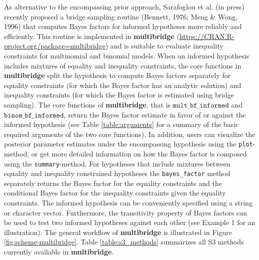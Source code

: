 \documentclass[
  english,
  man,floatsintext]{apa6}
\begin{document}
As alternative to the encompassing prior approach, Sarafoglou et al. (in press) recently proposed a bridge sampling routine (Bennett, 1976; Meng \& Wong, 1996) that computes Bayes factors for informed hypotheses more reliably and efficiently. This routine is implemented in \textbf{multibridge} (\url{https://CRAN.R-project.org/package=multibridge}) and is suitable to evaluate inequality constraints for multinomial and binomial models. When an informed hypothesis includes mixtures of equality and inequality constraints, the core functions in \textbf{multibridge} split the hypothesis to compute Bayes factors separately for equality constraints (for which the Bayes factor has an analytic solution) and inequality constraints (for which the Bayes factor is estimated using bridge sampling). The core functions of \textbf{multibridge}, that is \(\texttt{mult\_bf\_informed}\) and \(\texttt{binom\_bf\_informed}\), return the Bayes factor estimate in favor of or against the informed hypothesis (see Table \ref{table:arguments} for a summary of the basic required arguments of the two core functions). In addition, users can visualize the posterior parameter estimates under the encompassing hypothesis using the \texttt{plot}-method, or get more detailed information on how the Bayes factor is composed using the \texttt{summary}-method. For hypotheses that include mixtures between equality and inequality constrained hypotheses the \texttt{bayes\_factor} method separately returns the Bayes factor for the equality constraints and the conditional Bayes factor for the inequality constraints given the equality constraints. The informed hypothesis can be conveniently specified using a string or character vector. Furthermore, the transitivity property of Bayes factors can be used to test two informed hypotheses against each other (see Example 1 for an illustration). The general workflow of \textbf{multibridge} is illustrated in Figure \ref{fig:scheme-multibridge}. Table \ref{table:s3_methods} summarizes all S3 methods currently available in \textbf{multibridge}.
\end{document}

